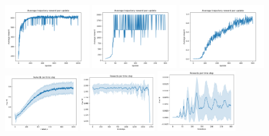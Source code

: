 \begin{figure}
	\begin{center}
		\includegraphics[width=0.325\textwidth]{plots/NAC_BB_training_mean_600.png}
		\includegraphics[width=0.325\textwidth]{plots/NAC_CP_mean_traj_update_reward.png}
		\includegraphics[width=0.325\textwidth]{plots/NAC_Qube_mean_traj_update_reward.png}
		\includegraphics[width=0.28\textwidth]{plots/NAC_BBtime_step_reward.png}	
		\hspace{4mm}
		\includegraphics[width=0.285\textwidth]{plots/NAC_CP_time_step_reward.png}
		\hspace{1mm}
		\includegraphics[width=0.3\textwidth]{plots/NAC_Qube_time_step_reward.png}

\end{center}
\end{figure}
